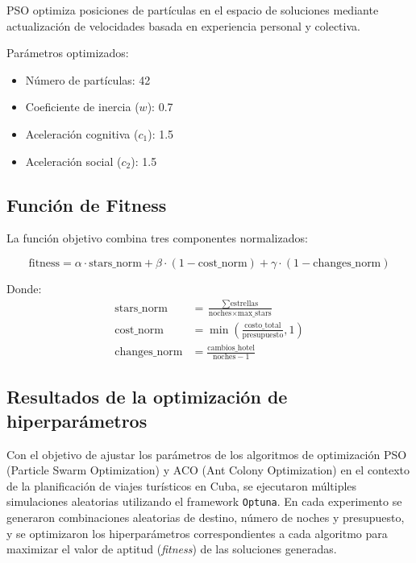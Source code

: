 \documentclass[runningheads]{llncs}
\begin{document}
PSO optimiza posiciones de partículas en el espacio de soluciones mediante actualización de velocidades basada en experiencia personal y colectiva.

Parámetros optimizados:
\begin{itemize}
\item Número de partículas: 42
\item Coeficiente de inercia ($w$): 0.7
\item Aceleración cognitiva ($c_1$): 1.5
\item Aceleración social ($c_2$): 1.5
\end{itemize}

\subsection{Función de Fitness}

La función objetivo combina tres componentes normalizados:

\begin{equation}
\text{fitness} = \alpha \cdot \text{stars\_norm} + \beta \cdot (1 - \text{cost\_norm}) + \gamma \cdot (1 - \text{changes\_norm})
\end{equation}

Donde:
\begin{align}
\text{stars\_norm} &= \frac{\sum \text{estrellas}}{\text{noches} \times \text{max\_stars}} \\
\text{cost\_norm} &= \min\left(\frac{\text{costo\_total}}{\text{presupuesto}}, 1\right) \\
\text{changes\_norm} &= \frac{\text{cambios\_hotel}}{\text{noches} - 1}
\end{align}

\subsection{Resultados de la optimización de hiperparámetros}

Con el objetivo de ajustar los parámetros de los algoritmos de optimización PSO (Particle Swarm Optimization) y ACO (Ant Colony Optimization) en el contexto de la planificación de viajes turísticos en Cuba, se ejecutaron múltiples simulaciones aleatorias utilizando el framework \texttt{Optuna}. En cada experimento se generaron combinaciones aleatorias de destino, número de noches y presupuesto, y se optimizaron los hiperparámetros correspondientes a cada algoritmo para maximizar el valor de aptitud (\textit{fitness}) de las soluciones generadas.
\end{document}
